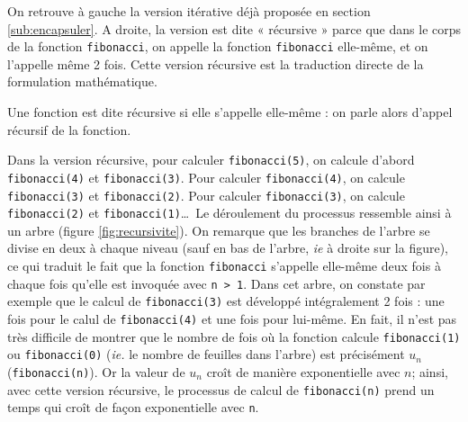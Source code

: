 \noindent On retrouve à gauche la version itérative déjà proposée en section
\ref{sub:encapsuler}. A droite, la version est dite « récursive » parce que
dans le corps de la fonction {\tt fibonacci}, on appelle la fonction 
{\tt fibonacci} elle-même, et on l'appelle même 2 fois. Cette version récursive est la traduction directe
de la formulation mathématique. 

\begin{defin}
Une fonction est dite récursive si elle s'appelle elle-même : on parle 
alors d'appel récursif de la fonction.
\end{defin}

Dans la version récursive, pour calculer {\tt fibonacci(5)},
on calcule d'abord {\tt fibonac\-ci(4)} et {\tt fibonac\-ci(3)}. Pour calculer {\tt fibonacci(4)},
on calcule {\tt fibonac\-ci(3)} et {\tt fibonac\-ci(2)}.
Pour calculer {\tt fibonacci(3)}, on calcule {\tt fibonacci(2)} et {\tt fibonac\-ci(1)}\ldots\ 
Le dérou\-le\-ment du processus ressemble ainsi à un arbre  
(figure \ref{fig:recursivite}). 
On remarque 
que les branches de l'arbre se divise en deux à chaque niveau 
(sauf en bas de l'arbre, {\em ie} à droite sur la figure), 
ce qui traduit le fait que la fonction {\tt fibonacci} s'appelle elle-même deux fois 
à chaque fois qu'elle est invoquée avec {\tt n > 1}. 
Dans cet arbre, on constate par exemple que 
le calcul de {\tt fibonacci(3)} est développé intégralement 2 fois : 
une fois pour le
calul de {\tt fibonacci(4)} et une fois pour lui-même.
En fait, il n'est pas très difficile de montrer que le nombre 
de fois où la fonction calcule {\tt fibonacci(1)} ou {\tt fibonacci(0)} 
({\em ie.} le nombre de feuilles dans l'arbre) est précisément 
$u_n$ ({\tt fibonacci(n)}).
Or la valeur de $u_n$ croît de manière exponentielle avec $n$; ainsi, avec cette version récursive, 
le processus de calcul de {\tt fibonacci(n)} prend un temps qui croît de façon exponentielle
avec {\tt n}.

